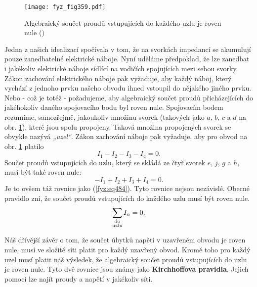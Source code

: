 {  \begin{figure}[ht!] %
    \centering
    \texttt{[image: fyz\_fig359.pdf]}
    \caption{Algebraický součet proudů vstupujících do každého uzlu je roven nule
             (\cite[s.~400]{Feynman02})}
    \label{fyz:fig359}
  \end{figure}
  
  Jedna z našich idealizací spočívala v tom, že na svorkách impedancí se akumulují pouze 
  zanedbatelné elektrické náboje. Nyní uděláme předpoklad, že lze zanedbat i jakékoliv elektrické 
  náboje sídlící na vodičích spojujících mezi sebou svorky. Zákon zachování elektrického náboje pak 
  vyžaduje, aby každý náboj, který vychází z jednoho prvku našeho obvodu ihned vstoupil do nějakého 
  jiného prvku. Nebo - což je totéž - požadujeme, aby algebraický součet proudů přicházejících do 
  jakéhokoliv daného spojovacího bodu byl roven nule. Spojovacím bodem rozumíme, samozřejmě, 
  jakoukoliv množinu svorek (takových jako \(a\), \(b\), \(c\) a \(d\) na obr. \ref{fyz:fig359}), 
  které jsou spolu propojeny. Taková množina propojených svorek se obvykle nazývá \emph{„uzel“}. 
  Zákon zachování náboje pak vyžaduje, aby pro obvod na obr. \ref{fyz:fig359} platilo
  \begin{equation}\label{fyz:eq484}
    I_1 - I_2 - I_3 - I_4 = 0.
  \end{equation}
  Součet proudů vstupujících do uzlu, který se skládá ze čtyř svorek \(e\), \(j\), \(g\) a \(h\), 
  musí být také roven nule:
  \begin{equation}\label{fyz:eq485}
    - I_1 + I_2 + I_3 + I_4 = 0.
  \end{equation}
  Je to ovšem táž rovnice jako (\ref{fyz:eq484}). Tyto rovnice nejsou nezávislé. Obecné pravidlo 
  zní, že součet proudů vstupujících do každého uzlu musí být roven nule.
  \begin{equation}\label{fyz:eq486}
    \sum_{\mathclap{\substack{\text{do}\\\text{uzlu}}}} I_n = 0.
  \end{equation}
  
  Náš dřívější závěr o tom, že součet úbytků napětí v uzavřeném obvodu je roven nule, musí ve 
  složité síti platit pro každý uzavřený obvod. Kromě toho pro každý uzel musí platit náš výsledek, 
  že algebraický součet proudů vstupujících do uzlu je roven nule. Tyto dvě rovnice jsou známy jako 
  \textbf{Kirchhoffova pravidla}. Jejich pomocí lze najít proudy a napětí v jakékoliv síti.
  
}
